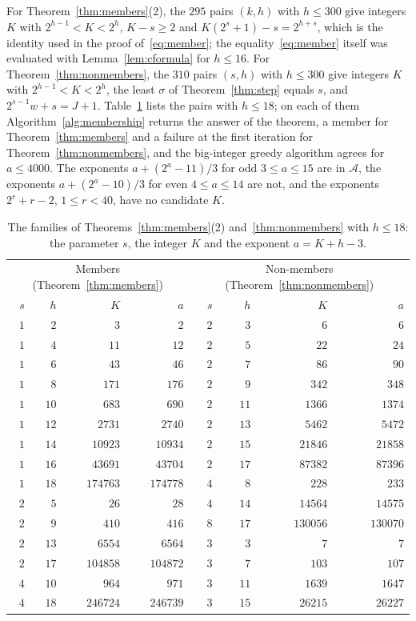 \documentclass[11pt]{amsart}
\theoremstyle{definition}
\begin{document}
For Theorem~\ref{thm:members}(2), the $295$ pairs $(k,h)$ with $h\le300$ give integers $K$ with $2^{h-1}<K<2^h$, $K-s\ge2$ and $K(2^s+1)-s=2^{h+s}$, which is the identity used in the proof of~\eqref{eq:member}; the equality~\eqref{eq:member} itself was evaluated with Lemma~\ref{lem:cformula} for $h\le16$. For Theorem~\ref{thm:nonmembers}, the $310$ pairs $(s,h)$ with $h\le300$ give integers $K$ with $2^{h-1}<K<2^h$, the least $\sigma$ of Theorem~\ref{thm:step} equals $s$, and $2^{s-1}w+s=J+1$. Table~\ref{tab:families} lists the pairs with $h\le18$; on each of them Algorithm~\ref{alg:membership} returns the answer of the theorem, a member for Theorem~\ref{thm:members} and a failure at the first iteration for Theorem~\ref{thm:nonmembers}, and the big-integer greedy algorithm agrees for $a\le4000$. The exponents $a+(2^a-11)/3$ for odd $3\le a\le15$ are in $\mathcal{A}$, the exponents $a+(2^a-10)/3$ for even $4\le a\le14$ are not, and the exponents $2^r+r-2$, $1\le r<40$, have no candidate $K$.

\begin{table}[H]
\centering
\caption{The families of Theorems~\ref{thm:members}(2) and~\ref{thm:nonmembers} with $h\le18$: the parameter $s$, the integer $K$ and the exponent $a=K+h-3$.}
\label{tab:families}
\begin{tabular}{rrrr@{\qquad}rrrr}
\toprule
\multicolumn{4}{c}{Members (Theorem~\ref{thm:members})} & \multicolumn{4}{c}{Non-members (Theorem~\ref{thm:nonmembers})}\\
$s$ & $h$ & $K$ & $a$ & $s$ & $h$ & $K$ & $a$\\
\midrule
$1$ & $2$ & $3$ & $2$ & $2$ & $3$ & $6$ & $6$\\
$1$ & $4$ & $11$ & $12$ & $2$ & $5$ & $22$ & $24$\\
$1$ & $6$ & $43$ & $46$ & $2$ & $7$ & $86$ & $90$\\
$1$ & $8$ & $171$ & $176$ & $2$ & $9$ & $342$ & $348$\\
$1$ & $10$ & $683$ & $690$ & $2$ & $11$ & $1366$ & $1374$\\
$1$ & $12$ & $2731$ & $2740$ & $2$ & $13$ & $5462$ & $5472$\\
$1$ & $14$ & $10923$ & $10934$ & $2$ & $15$ & $21846$ & $21858$\\
$1$ & $16$ & $43691$ & $43704$ & $2$ & $17$ & $87382$ & $87396$\\
$1$ & $18$ & $174763$ & $174778$ & $4$ & $8$ & $228$ & $233$\\
$2$ & $5$ & $26$ & $28$ & $4$ & $14$ & $14564$ & $14575$\\
$2$ & $9$ & $410$ & $416$ & $8$ & $17$ & $130056$ & $130070$\\
$2$ & $13$ & $6554$ & $6564$ & $3$ & $3$ & $7$ & $7$\\
$2$ & $17$ & $104858$ & $104872$ & $3$ & $7$ & $103$ & $107$\\
$4$ & $10$ & $964$ & $971$ & $3$ & $11$ & $1639$ & $1647$\\
$4$ & $18$ & $246724$ & $246739$ & $3$ & $15$ & $26215$ & $26227$\\
\bottomrule
\end{tabular}
\end{table}
\end{document}

